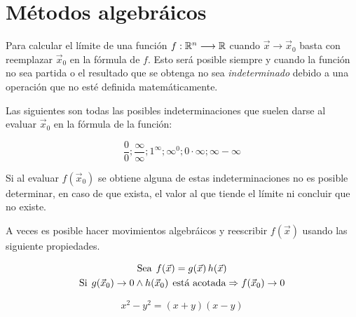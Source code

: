 \section{Métodos algebráicos}

Para calcular el límite de una función $f:\mathbb{R}^n \longrightarrow \mathbb{R}$ cuando $\Vec{x} \to \Vec{x}_0$ basta con reemplazar $\Vec{x}_0$ en la fórmula de $f$.
Esto será posible siempre y cuando la función no sea partida o el resultado que se obtenga no sea \emph{indeterminado} debido a una operación que no esté definida matemáticamente.

Las siguientes son todas las posibles indeterminaciones que suelen darse al evaluar $\Vec{x}_0$ en la fórmula de la función:

\begin{equation*}
    \dfrac{0}{0} ; \dfrac{\infty}{\infty} ; 1^\infty ; \infty^0 ; 0 \cdot \infty ; \infty-\infty
\end{equation*}

Si al evaluar $f(\Vec{x}_0)$ se obtiene alguna de estas indeterminaciones no es posible determinar, en caso de que exista, el valor al que tiende el límite ni concluir que no existe.

A veces es posible hacer movimientos algebráicos y reescribir $f(\Vec{x})$ usando las siguiente propiedades.

\begin{mdframed}[style=PropertyFrame]
    \begin{prop}
    \end{prop}
    \begin{gather*}
        \textrm{Sea} \hspace{1ex} f(\Vec{x}) = g(\Vec{x}) \, h(\Vec{x})
        \\
        \textrm{Si} \hspace{1ex} g(\Vec{x}_0) \to 0 \land h(\Vec{x}_0) \hspace{1ex} \textrm{está acotada}
        \Rightarrow f(\Vec{x}_0) \to 0
    \end{gather*}
\end{mdframed}


\begin{mdframed}[style=PropertyFrame]
    \begin{prop}
    \end{prop}
    \begin{equation*}
        x^2-y^2 = (x+y)(x-y)
    \end{equation*}
\end{mdframed}

